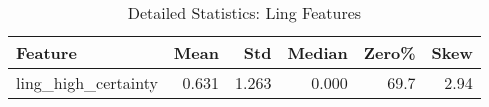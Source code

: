 \begin{table}[htbp]
\centering
\caption{Detailed Statistics: Ling Features}
\label{tab:ling_details}
\begin{tabular}{lrrrrr}
\toprule
Feature & Mean & Std & Median & Zero\% & Skew \\
\midrule
ling\_high\_certainty & 0.631 & 1.263 & 0.000 & 69.7 & 2.94 \\
\bottomrule
\end{tabular}
\end{table}
